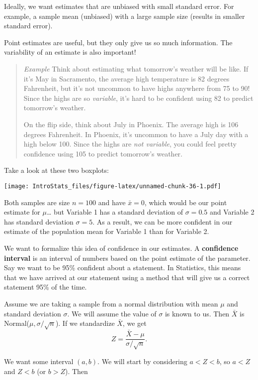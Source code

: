 \documentclass[
]{book}
\begin{document}
Ideally, we want estimates that are unbiased with small standard error. For example, a sample mean (unbiased) with a large sample size (results in smaller standard error).

Point estimates are useful, but they only give us so much information. The variability of an estimate is also important!

\begin{quote}
\emph{Example} Think about estimating what tomorrow's weather will be like. If it's May in Sacramento, the average high temperature is 82 degrees Fahrenheit, but it's not uncommon to have highs anywhere from 75 to 90! Since the highs are so \emph{variable}, it's hard to be confident using 82 to predict tomorrow's weather.

On the flip side, think about July in Phoenix. The average high is 106 degrees Fahrenheit. In Phoenix, it's uncommon to have a July day with a high below 100. Since the highs are \emph{not variable}, you could feel pretty confidence using 105 to predict tomorrow's weather.
\end{quote}

Take a look at these two boxplots:

\texttt{[image: IntroStats\_files/figure-latex/unnamed-chunk-36-1.pdf]}

Both samples are size \(n=100\) and have \(\bar{x}=0\), which would be our point estimate for \(\mu\)\ldots{} but Variable 1 has a standard deviation of \(\sigma=0.5\) and Variable 2 has standard deviation \(\sigma=5\). As a result, we can be more confident in our estimate of the population mean for Variable 1 than for Variable 2.

We want to formalize this idea of confidence in our estimates. A \textbf{confidence interval} is an interval of numbers based on the point estimate of the parameter. Say we want to be 95\% confident about a statement. In Statistics, this means that we have arrived at our statement using a method that will give us a correct statement 95\% of the time.

Assume we are taking a sample from a normal distribution with mean \(\mu\) and standard deviation \(\sigma\). We will assume the value of \(\sigma\) is known to us. Then \(\bar{X}\) is Normal(\(\mu, \sigma/\sqrt{n}\)). If we standardize \(\bar{X}\), we get \[Z = \frac{\bar{X}-\mu}{\sigma/\sqrt{n}}.\]

We want some interval \((a,b)\). We will start by considering \(a < Z < b\), so \(a < Z\) and \(Z < b\) (or \(b > Z\)). Then
\end{document}
